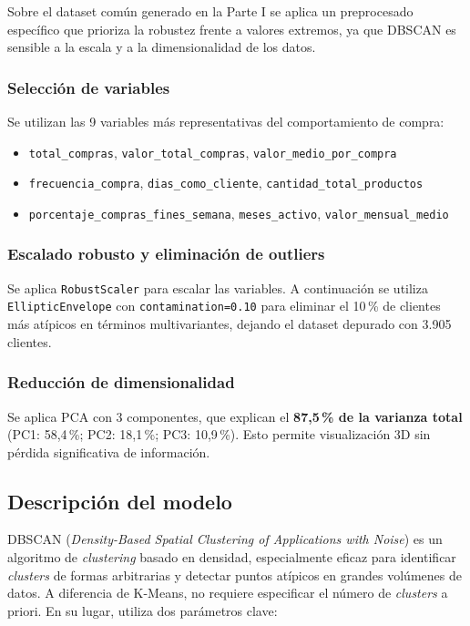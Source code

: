 \documentclass[11pt,a4paper]{article}
\begin{document}
Sobre el dataset común generado en la Parte I se aplica un preprocesado específico que prioriza la robustez frente a valores extremos, ya que DBSCAN es sensible a la escala y a la dimensionalidad de los datos.

\subsubsection{Selección de variables}

Se utilizan las 9 variables más representativas del comportamiento de compra:

\begin{itemize}
    \item \texttt{total\_compras}, \texttt{valor\_total\_compras}, \texttt{valor\_medio\_por\_compra}
    \item \texttt{frecuencia\_compra}, \texttt{dias\_como\_cliente}, \texttt{cantidad\_total\_productos}
    \item \texttt{porcentaje\_compras\_fines\_semana}, \texttt{meses\_activo}, \texttt{valor\_mensual\_medio}
\end{itemize}

\subsubsection{Escalado robusto y eliminación de outliers}

Se aplica \texttt{RobustScaler} para escalar las variables. A continuación se utiliza \texttt{EllipticEnvelope} con \texttt{contamination=0.10} para eliminar el 10\,\% de clientes más atípicos en términos multivariantes, dejando el dataset depurado con 3.905 clientes.

\subsubsection{Reducción de dimensionalidad}

Se aplica PCA con 3 componentes, que explican el \textbf{87,5\,\% de la varianza total} (PC1: 58,4\,\%; PC2: 18,1\,\%; PC3: 10,9\,\%). Esto permite visualización 3D sin pérdida significativa de información.

\subsection{Descripción del modelo}

DBSCAN (\textit{Density-Based Spatial Clustering of Applications with Noise}) es un algoritmo de \textit{clustering} basado en densidad, especialmente eficaz para identificar \textit{clusters} de formas arbitrarias y detectar puntos atípicos en grandes volúmenes de datos. A diferencia de K-Means, no requiere especificar el número de \textit{clusters} a priori. En su lugar, utiliza dos parámetros clave:
\end{document}
